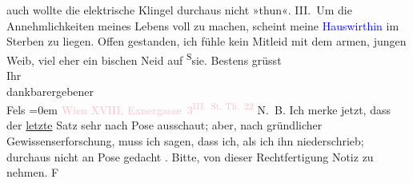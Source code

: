                     auch wollte die elektrische Klingel durchaus nicht »thun«.\pend
           \pstart
           III. Um die Annehmlichkeiten meines Lebens voll zu machen, scheint meine \textcolor{blue}{Hauswirthin}{} im Sterben zu
                    liegen. Offen gestanden, ich fühle kein Mitleid mit dem armen, jungen Weib, viel
                    eher ein bischen Neid auf \substVorne{}\textsuperscript{S}\substDazwischen{}s\substHinten{}ie.\pend
           \pstart
           Bestens grüsst{\\[\baselineskip]}Ihr{\\[\baselineskip]}dankbarergebener{\\[\baselineskip]}\spacefill\mbox{Fels}\pend
           \leftskip=0em{}\pstart
           \noindent{}\textcolor{pink}{Wien XVIII, Exnergasse 3\textsuperscript{III. St. Th. 22}}{}\ledrightnote{\textcolor{pink}{Krütznergasse}}\pend
           \pstart
           N. B. Ich merke jetzt, dass der \uline{letzte} Satz
                        sehr nach Pose ausschaut; aber, nach gründlicher Gewissenserforschung, muss
                        ich sagen, dass ich, als ich ihn niederschrieb; durchaus nicht an Pose
                        gedacht \label{T_L00326_1v}\label{T_L00326_1h}. Bitte, von dieser
                        Rechtfertigung Notiz zu nehmen. \spacefill\mbox{F}\pend
           \endnumbering{}  
      